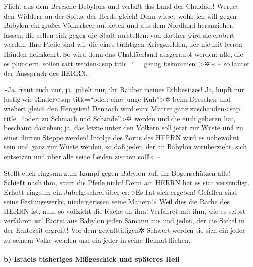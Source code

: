 Flieht aus dem Bereiche Babylons und verlaßt das Land der
Chaldäer! Werdet den Widdern an der Spitze der Herde gleich!
Denn wisset wohl: ich will gegen Babylon ein großes
Völkerheer aufbieten und aus dem Nordland heranziehen lassen; die sollen
sich gegen die Stadt aufstellen: von dorther wird sie erobert werden.
Ihre Pfeile sind wie die eines tüchtigen Kriegshelden, der nie mit
leeren Händen heimkehrt. So wird denn das Chaldäerland
ausgeraubt werden: alle, die es plündern, sollen satt
werden\textless sup title=``=~genug bekommen''\textgreater✲!« -- so
lautet der Ausspruch des HERRN.~--

»Ja, freut euch nur, ja, jubelt nur, ihr Räuber meines
Erbbesitzes! Ja, hüpft nur lustig wie Rinder\textless sup title=``oder:
eine junge Kuh''\textgreater✲ beim Dreschen und wiehert gleich den
Hengsten! Dennoch wird eure Mutter ganz
zuschanden\textless sup title=``oder: zu Schmach und
Schande''\textgreater✲ werden und die euch geboren hat, beschämt
dastehen; ja, das letzte unter den Völkern soll jetzt zur Wüste und zu
einer dürren Steppe werden! Infolge des Zorns des HERRN
wird es unbewohnt sein und ganz zur Wüste werden, so daß jeder, der an
Babylon vorüberzieht, sich entsetzen und über alle seine Leiden zischen
soll!«~--

Stellt euch ringsum zum Kampf gegen Babylon auf, ihr
Bogenschützen alle! Schießt nach ihm, spart die Pfeile nicht! Denn am
HERRN hat es sich versündigt. Erhebt ringsum ein
Jubelgeschrei über es: »Es hat sich ergeben! Gefallen sind seine
Festungswerke, niedergerissen seine Mauern!« Weil dies die Rache des
HERRN ist, nun, so vollzieht die Rache an ihm! Verfahret mit ihm, wie es
selbst verfahren ist! Rottet aus Babylon jeden Sämann aus
und jeden, der die Sichel in der Erntezeit ergreift! Vor dem
gewalttätigen✲ Schwert werden sie sich ein jeder zu seinem Volke wenden
und ein jeder in seine Heimat fliehen.

\hypertarget{b-israels-bisheriges-miuxdfgeschick-und-spuxe4teres-heil}{%
\paragraph{b) Israels bisheriges Mißgeschick und späteres
Heil}\label{b-israels-bisheriges-miuxdfgeschick-und-spuxe4teres-heil}}


